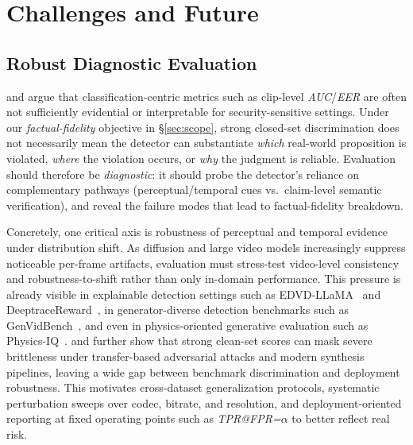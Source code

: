 \section{Challenges and Future}
\label{sec:challenges}

\subsection{Robust Diagnostic Evaluation}
\label{sec:eval-diagnostic}

\citet{chen2024x2dfd} and \citet{sun2025edvd} argue that classification-centric metrics such as clip-level \textit{AUC}/\textit{EER} are often not sufficiently evidential or interpretable for security-sensitive settings.
Under our \emph{factual-fidelity} objective in \S\ref{sec:scope}, strong closed-set discrimination does not necessarily mean the detector can substantiate \emph{which} real-world proposition is violated, \emph{where} the violation occurs, or \emph{why} the judgment is reliable.
Evaluation should therefore be \emph{diagnostic}: it should probe the detector's reliance on complementary pathways (perceptual/temporal cues vs.\ claim-level semantic verification), and reveal the failure modes that lead to factual-fidelity breakdown.

Concretely, one critical axis is robustness of perceptual and temporal evidence under distribution shift.
As diffusion and large video models increasingly suppress noticeable per-frame artifacts, evaluation must stress-test video-level consistency and robustness-to-shift rather than only in-domain performance.
This pressure is already visible in explainable detection settings such as EDVD-LLaMA~\citep{sun2025edvd} and DeeptraceReward~\citep{Fu2025DeeptraceReward}, in generator-diverse detection benchmarks such as GenVidBench~\citep{ni2025genvidbench}, and even in physics-oriented generative evaluation such as Physics-IQ~\citep{motamed2025generative}.
\citet{DBLP:journals/corr/abs-2601-05986} and \citet{hasan2026uneven} further show that strong clean-set scores can mask severe brittleness under transfer-based adversarial attacks and modern synthesis pipelines, leaving a wide gap between benchmark discrimination and deployment robustness.
This motivates cross-dataset generalization protocols, systematic perturbation sweeps over codec, bitrate, and resolution, and deployment-oriented reporting at fixed operating points such as \textit{TPR@FPR=$\alpha$} to better reflect real risk.

